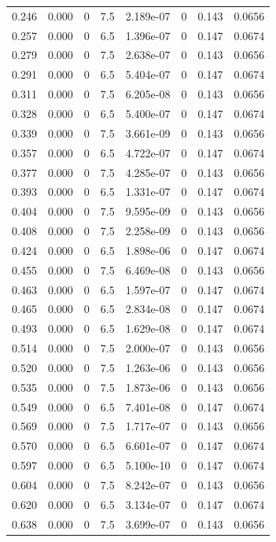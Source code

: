 \documentclass[preview]{standalone}
\begin{document}
{{\begin{tabular}{L{1.2cm}C{1.2cm} C{0.3cm}C{0.5cm} C{1.4cm}C{1.4cm} C{1.4cm}C{1.4cm}}
  0.246  &  0.000  & 0     & 7.5 &  2.189e-07  & 0  & 0.143 &  0.0656   \\ 
  0.257  &  0.000  & 0     & 6.5 &  1.396e-07  & 0  & 0.147 &  0.0674   \\ 
  0.279  &  0.000  & 0     & 7.5 &  2.638e-07  & 0  & 0.143 &  0.0656   \\ 
  0.291  &  0.000  & 0     & 6.5 &  5.404e-07  & 0  & 0.147 &  0.0674   \\ 
  0.311  &  0.000  & 0     & 7.5 &  6.205e-08  & 0  & 0.143 &  0.0656   \\ 
  0.328  &  0.000  & 0     & 6.5 &  5.400e-07  & 0  & 0.147 &  0.0674   \\ 
  0.339  &  0.000  & 0     & 7.5 &  3.661e-09  & 0  & 0.143 &  0.0656   \\ 
  0.357  &  0.000  & 0     & 6.5 &  4.722e-07  & 0  & 0.147 &  0.0674   \\ 
  0.377  &  0.000  & 0     & 7.5 &  4.285e-07  & 0  & 0.143 &  0.0656   \\ 
  0.393  &  0.000  & 0     & 6.5 &  1.331e-07  & 0  & 0.147 &  0.0674   \\ 
  0.404  &  0.000  & 0     & 7.5 &  9.595e-09  & 0  & 0.143 &  0.0656   \\ 
  0.408  &  0.000  & 0     & 7.5 &  2.258e-09  & 0  & 0.143 &  0.0656   \\ 
  0.424  &  0.000  & 0     & 6.5 &  1.898e-06  & 0  & 0.147 &  0.0674   \\ 
  0.455  &  0.000  & 0     & 7.5 &  6.469e-08  & 0  & 0.143 &  0.0656   \\ 
  0.463  &  0.000  & 0     & 6.5 &  1.597e-07  & 0  & 0.147 &  0.0674   \\ 
  0.465  &  0.000  & 0     & 6.5 &  2.834e-08  & 0  & 0.147 &  0.0674   \\ 
  0.493  &  0.000  & 0     & 6.5 &  1.629e-08  & 0  & 0.147 &  0.0674   \\ 
  0.514  &  0.000  & 0     & 7.5 &  2.000e-07  & 0  & 0.143 &  0.0656   \\ 
  0.520  &  0.000  & 0     & 7.5 &  1.263e-06  & 0  & 0.143 &  0.0656   \\ 
  0.535  &  0.000  & 0     & 7.5 &  1.873e-06  & 0  & 0.143 &  0.0656   \\ 
  0.549  &  0.000  & 0     & 6.5 &  7.401e-08  & 0  & 0.147 &  0.0674   \\ 
  0.569  &  0.000  & 0     & 7.5 &  1.717e-07  & 0  & 0.143 &  0.0656   \\ 
  0.570  &  0.000  & 0     & 6.5 &  6.601e-07  & 0  & 0.147 &  0.0674   \\ 
  0.597  &  0.000  & 0     & 6.5 &  5.100e-10  & 0  & 0.147 &  0.0674   \\ 
  0.604  &  0.000  & 0     & 7.5 &  8.242e-07  & 0  & 0.143 &  0.0656   \\ 
  0.620  &  0.000  & 0     & 6.5 &  3.134e-07  & 0  & 0.147 &  0.0674   \\ 
  0.638  &  0.000  & 0     & 7.5 &  3.699e-07  & 0  & 0.143 &  0.0656   \\ 
\hline 
\end{tabular} 

}}
\end{document}
